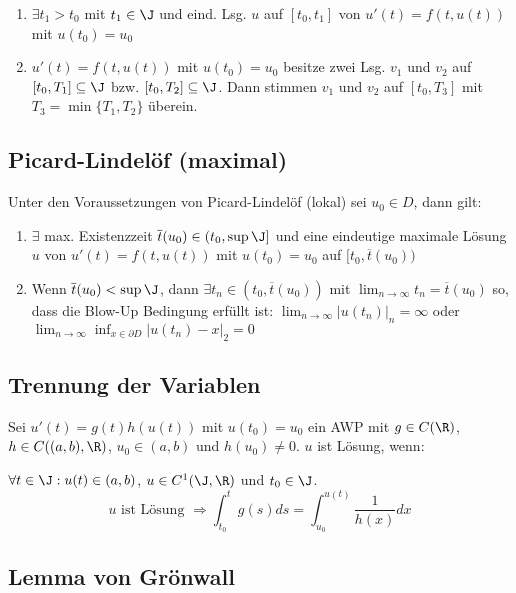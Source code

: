 \begin{enumerate}[label=(\alph*)]
	\item \(\exists t_1 > t_0 \) mit \(t_1 \in \J\) und eind. Lsg. \(u\)  auf \([t_0, t_1]\) von \(u'(t) = f(t, u(t))\) mit \(u(t_0) = u_0\)
	\item \(u'(t) = f(t, u(t))\) mit \(u(t_0) = u_0\) besitze zwei Lsg. \(v_1\) und \(v_2\) auf \([t_0, T_1] \subseteq \J\) bzw. \([t_0, T_2] \subseteq \J\). Dann stimmen \(v_1\) und \(v_2\) auf \([t_0, T_3]\) mit \(T_3 = \min\{T_1, T_2\}\) überein.
\end{enumerate}

\subsection*{Picard-Lindelöf (maximal)}

Unter den Voraussetzungen von Picard-Lindelöf (lokal) sei \(u_0 \in D\), dann gilt:

\begin{enumerate}[label=(\alph*)]
	\item \(\exists\) max. Existenzzeit \(\overline t(u_0) \in (t_0, \sup \J]\) und eine eindeutige maximale Lösung \(u\) von \(u'(t) = f(t, u(t))\) mit \(u(t_0) = u_0\) auf \([t_0, \overline t(u_0))\)
	\item Wenn \(\overline t(u_0) < \sup \J\), dann \(\exists t_n \in (t_0, \overline t(u_0))\) mit \(\lim_{n \to \infty} t_n = \overline t(u_0)\) so, dass die Blow-Up Bedingung erfüllt ist: \(\lim_{n \to \infty} |u(t_n)|_n = \infty\) oder \(\lim_{n \to \infty} \inf_{x \in \partial D} |u(t_n) - x|_2 = 0\)
\end{enumerate}

\subsection*{Trennung der Variablen}

Sei \(u'(t)=g(t)h(u(t))\) mit \(u(t_0)=u_0\) ein AWP mit \(g \in C(\R)\), \(h \in C((a, b), \R)\), \(u_0 \in (a, b)\) und \(h(u_0) \neq 0\). \(u\) ist Lösung, wenn:

\(\forall t \in \J : u(t) \in (a, b)\), \(u \in C^1(\J, \R)\) und \(t_0 \in \J\).
\[ u \text{ ist Lösung } \Rightarrow \int_{t_0}^t g(s) ds = \int_{u_0}^{u(t)} \frac{1}{h(x)} dx \]

\subsection*{Lemma von Grönwall}

